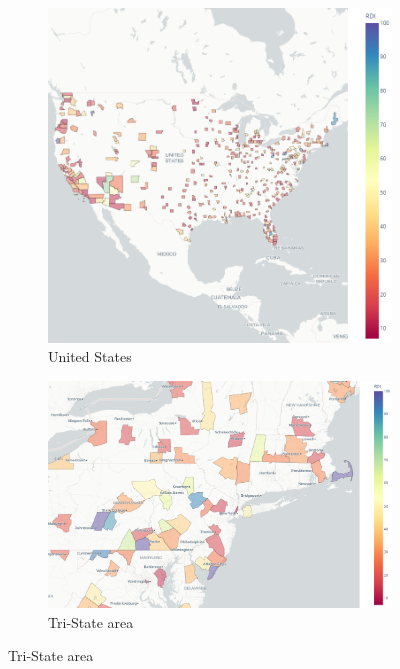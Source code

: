 \documentclass[APA,Times1COL]{WileyNJDv5} %
\begin{document}
\begin{figure}[t]
	\centering
	
	\begin{subfigure}[b]{0.32\textwidth}
		\includegraphics[width=\linewidth]{us.png}
		\caption{United States}\label{fig:us_choropleth}
	\end{subfigure}\hfill
	\begin{subfigure}[b]{0.32\textwidth}
		\includegraphics[width=\linewidth]{tristate.png}
		\caption{Tri‑State area}\label{fig:tristate_choropleth}
	\end{subfigure}\hfill

\end{figure}
\end{document}
